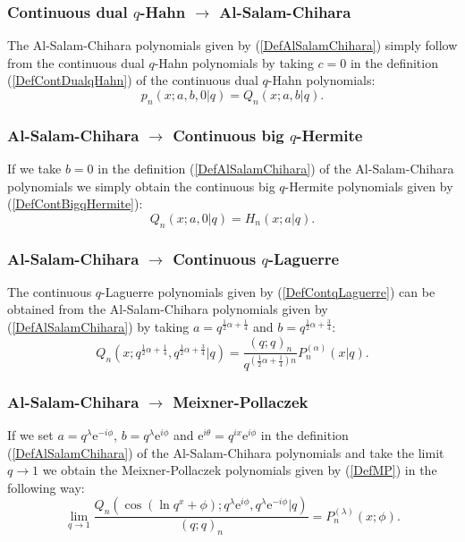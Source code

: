 \documentclass[envcountchap,graybox]{svmono}
\newcounter{rom}
\newcommand{\e}{\textrm{e}}
\begin{document}
\subsubsection*{Continuous dual $q$-Hahn $\rightarrow$ Al-Salam-Chihara}
The Al-Salam-Chihara polynomials given by (\ref{DefAlSalamChihara}) simply follow
from the continuous dual $q$-Hahn polynomials by taking $c=0$ in the
definition (\ref{DefContDualqHahn}) of the continuous dual $q$-Hahn polynomials:
$$p_n(x;a,b,0|q)=Q_n(x;a,b|q).$$

\subsubsection*{Al-Salam-Chihara $\rightarrow$ Continuous big $q$-Hermite}
If we take $b=0$ in the definition (\ref{DefAlSalamChihara}) of the Al-Salam-Chihara
polynomials we simply obtain the continuous big $q$-Hermite polynomials given by
(\ref{DefContBigqHermite}):
\begin{equation}
Q_n(x;a,0|q)=H_n(x;a|q).
\end{equation}

\subsubsection*{Al-Salam-Chihara $\rightarrow$ Continuous $q$-Laguerre}
The continuous $q$-Laguerre polynomials given by (\ref{DefContqLaguerre})
can be obtained from the Al-Salam-Chihara polynomials given by
(\ref{DefAlSalamChihara}) by taking $a=q^{\frac{1}{2}\alpha+\frac{1}{4}}$ and
$b=q^{\frac{1}{2}\alpha+\frac{3}{4}}$:
\begin{equation}
Q_n(x;q^{\frac{1}{2}\alpha+\frac{1}{4}},q^{\frac{1}{2}\alpha+\frac{3}{4}}|q)
=\frac{(q;q)_n}{q^{(\frac{1}{2}\alpha+\frac{1}{4})n}}P_n^{(\alpha)}(x|q).
\end{equation}

\subsubsection*{Al-Salam-Chihara $\rightarrow$ Meixner-Pollaczek}
If we set $a=q^{\lambda}\e^{-i\phi}$, $b=q^{\lambda}\e^{i\phi}$ and
$\e^{i\theta}=q^{ix}\e^{i\phi}$ in the definition (\ref{DefAlSalamChihara}) of
the Al-Salam-Chihara polynomials and take the limit $q\rightarrow 1$ we obtain
the Meixner-Pollaczek polynomials given by (\ref{DefMP}) in the following
way:
\begin{equation}
\lim_{q\rightarrow 1}\frac{Q_n(\cos(\ln q^x+\phi);
q^{\lambda}\e^{i\phi},q^{\lambda}\e^{-i\phi}|q)}{(q;q)_n}=P_n^{(\lambda)}(x;\phi).
\end{equation}
\end{document}
